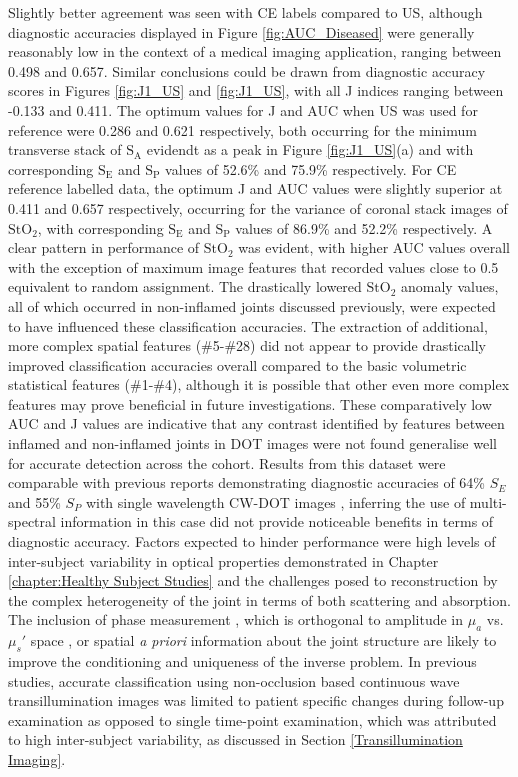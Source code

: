 \documentclass[twoside]{bhamthesis}
\theoremstyle{definition}
\begin{document}
Slightly better agreement was seen with CE labels compared to US, although diagnostic accuracies displayed in Figure \ref{fig:AUC_Diseased} were generally reasonably low in the context of a medical imaging application, ranging between 0.498 and 0.657. Similar conclusions could be drawn from diagnostic accuracy scores in Figures \ref{fig:J1_US} and \ref{fig:J1_US}, with all J indices ranging between -0.133 and 0.411. The optimum values for J and AUC when US was used for reference were 0.286 and 0.621 respectively, both occurring for the minimum transverse stack of $\mathrm{S_A}$ evidendt as a peak in Figure \ref{fig:J1_US}(a) and with corresponding $\mathrm{S_E}$ and $\mathrm{S_P}$ values of 52.6\% and 75.9\% respectively. For CE reference labelled data, the optimum J and AUC values were slightly superior at 0.411 and 0.657 respectively, occurring for the variance of coronal stack images of $\mathrm{StO_2}$, with corresponding $\mathrm{S_E}$ and $\mathrm{S_P}$ values of 86.9\% and 52.2\% respectively. A clear pattern in performance of $\mathrm{StO_2}$ was evident, with higher AUC values overall with the exception of maximum image features that recorded values close to 0.5 equivalent to random assignment. The drastically lowered $\mathrm{StO_2}$ anomaly values, all of which occurred in non-inflamed joints discussed previously, were expected to have influenced these classification accuracies. The extraction of additional, more complex spatial features (\#5-\#28) did not appear to provide drastically improved classification accuracies overall compared to the basic volumetric statistical features (\#1-\#4), although it is possible that other even more complex features may prove beneficial in future investigations. These comparatively low AUC and J values are indicative that any contrast identified by features between inflamed and non-inflamed joints in DOT images were not found generalise well for accurate detection across the cohort. Results from this dataset were comparable with previous reports demonstrating diagnostic accuracies of 64\% $S_E$ and 55\% $S_P$ with single wavelength CW-DOT images \cite{hielscher2011frequency}, inferring the use of multi-spectral information in this case did not provide noticeable benefits in terms of diagnostic accuracy. Factors expected to hinder performance were high levels of inter-subject variability in optical properties demonstrated in Chapter 
\ref{chapter:Healthy Subject Studies} and the challenges posed to reconstruction by the complex heterogeneity of the joint in terms of both scattering and absorption. The inclusion of phase measurement \cite{hielscher2011frequency}, which is orthogonal to amplitude in $\mu_a$ vs. $\mu_s'$ space \cite{chu2009image}, or spatial \textit{a priori} information about the joint structure \cite{yuan2010image} are likely to improve the conditioning and uniqueness of the inverse problem. In previous studies, accurate classification using non-occlusion based continuous wave transillumination images was limited to patient specific changes during follow-up examination as opposed to single time-point examination, which was attributed to high inter-subject variability, as discussed in Section \ref{Transillumination Imaging}. 
 
\end{document}
